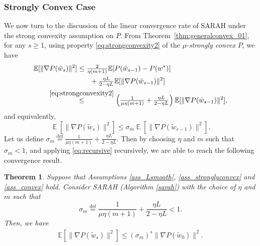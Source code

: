 \documentclass{article}
\newtheorem{thm}{Theorem}
\newcommand{\tc}[1]{\textcolor{Magenta}{\bf #1}}
\DeclareMathOperator{\Exp}{\mathbb{E}}           %
\newcommand{\eqdef}{\stackrel{\text{def}}{=}}
\begin{document}
 


\subsubsection{Strongly Convex Case}

We now turn to 
the discussion of the linear convergence rate of SARAH under the strong convexity assumption on $P$.
From Theorem~\ref{thm:generalconvex_01}, for any $s\geq 1$, using property \eqref{eq:strongconvexity2} of the $\mu$-\emph{strongly convex} $P$, we have
\begin{align*}
&\mathbb{E}[ \| \nabla P(\tilde{w}_s)\|^2 ] 
\leq \tfrac{2}{\eta (m + 1)} \mathbb{E}[ P(\tilde w_{s-1}) - P(w^{*})]  
\\ %
&\qquad\qquad\qquad\qquad + \tfrac{ \eta L}{2 - \eta L}  \mathbb{E}[ \| \nabla P(\tilde w_{s-1})\|^2 ] 
\\ %
&\qquad \overset{\eqref{eq:strongconvexity2}}{\leq} 
\left( \tfrac{1}{\mu \eta (m+1)} + \tfrac{\eta L}{2 - \eta L} \right) \mathbb{E}[ \| \nabla P(\tilde w_{s-1})\|^2 ],
\end{align*}
and equivalently,
\begin{equation}\label{eq:recursive}
\Exp [ \| \nabla P(\tilde{w}_s)\|^2 ] \leq \sigma_m \Exp [ \| \nabla P(\tilde w_{s-1})\|^2 ].
\end{equation}
Let us define $\sigma_m \eqdef \tfrac{1}{\mu \eta (m + 1)} +  \tfrac{\eta L}{2 - \eta L}$.  
Then by choosing  $\eta$ and $m$ such that $\sigma_m<1$, and applying \eqref{eq:recursive} recursively, we are able to reach the following convergence result.
\begin{thm}\label{thm:stronglyconvexconvergence}
Suppose that Assumptions \ref{ass_Lsmooth}, \ref{ass_stronglyconvex} and \ref{ass_convex} hold. Consider  SARAH (Algorithm \ref{sarah})
 with the choice of $\eta$ and $m$ such that
\begin{equation}\label{eq:sigma0}
\sigma_m \eqdef \frac{1}{\mu \eta (m + 1)} +  \frac{\eta L}{2 - \eta L}  < 1. 
\end{equation}
Then, we have
\begin{align*}
\mathbb{E}[ \| \nabla P(\tilde{w}_s)\|^2 ] \leq (\sigma_m)^s \| \nabla P(\tilde{w}_0)\|^2. 
\end{align*}
\end{thm}
\end{document}
